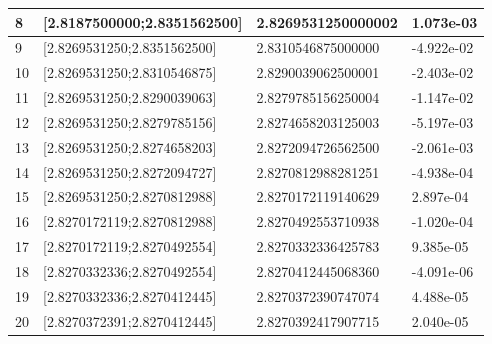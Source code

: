 \documentclass[a4paper, 11pt]{article}
\begin{document}
\begin{table}[H]
\begin{tabular}{llll}
\multicolumn{1}{|l|}{8} & \multicolumn{1}{l|}{{[}2.8187500000;2.8351562500{]}} & \multicolumn{1}{l|}{2.8269531250000002} & \multicolumn{1}{l|}{1.073e-03} \\ \hline
\multicolumn{1}{|l|}{9} & \multicolumn{1}{l|}{{[}2.8269531250;2.8351562500{]}} & \multicolumn{1}{l|}{2.8310546875000000} & \multicolumn{1}{l|}{-4.922e-02} \\ \hline
\multicolumn{1}{|l|}{10} & \multicolumn{1}{l|}{{[}2.8269531250;2.8310546875{]}} & \multicolumn{1}{l|}{2.8290039062500001} & \multicolumn{1}{l|}{-2.403e-02} \\ \hline
\multicolumn{1}{|l|}{11} & \multicolumn{1}{l|}{{[}2.8269531250;2.8290039063{]}} & \multicolumn{1}{l|}{2.8279785156250004} & \multicolumn{1}{l|}{-1.147e-02} \\ \hline
\multicolumn{1}{|l|}{12} & \multicolumn{1}{l|}{{[}2.8269531250;2.8279785156{]}} & \multicolumn{1}{l|}{2.8274658203125003} & \multicolumn{1}{l|}{-5.197e-03} \\ \hline
\multicolumn{1}{|l|}{13} & \multicolumn{1}{l|}{{[}2.8269531250;2.8274658203{]}} & \multicolumn{1}{l|}{2.8272094726562500} & \multicolumn{1}{l|}{-2.061e-03} \\ \hline
\multicolumn{1}{|l|}{14} & \multicolumn{1}{l|}{{[}2.8269531250;2.8272094727{]}} & \multicolumn{1}{l|}{2.8270812988281251} & \multicolumn{1}{l|}{-4.938e-04} \\ \hline
\multicolumn{1}{|l|}{15} & \multicolumn{1}{l|}{{[}2.8269531250;2.8270812988{]}} & \multicolumn{1}{l|}{2.8270172119140629} & \multicolumn{1}{l|}{2.897e-04} \\ \hline
\multicolumn{1}{|l|}{16} & \multicolumn{1}{l|}{{[}2.8270172119;2.8270812988{]}} & \multicolumn{1}{l|}{2.8270492553710938} & \multicolumn{1}{l|}{-1.020e-04} \\ \hline
\multicolumn{1}{|l|}{17} & \multicolumn{1}{l|}{{[}2.8270172119;2.8270492554{]}} & \multicolumn{1}{l|}{2.8270332336425783} & \multicolumn{1}{l|}{9.385e-05} \\ \hline
\multicolumn{1}{|l|}{18} & \multicolumn{1}{l|}{{[}2.8270332336;2.8270492554{]}} & \multicolumn{1}{l|}{2.8270412445068360} & \multicolumn{1}{l|}{-4.091e-06} \\ \hline
\multicolumn{1}{|l|}{19} & \multicolumn{1}{l|}{{[}2.8270332336;2.8270412445{]}} & \multicolumn{1}{l|}{2.8270372390747074} & \multicolumn{1}{l|}{4.488e-05} \\ \hline
\multicolumn{1}{|l|}{20} & \multicolumn{1}{l|}{{[}2.8270372391;2.8270412445{]}} & \multicolumn{1}{l|}{2.8270392417907715} & \multicolumn{1}{l|}{2.040e-05} \\ \hline

\end{tabular}
\end{table}
\end{document}
